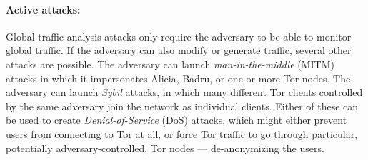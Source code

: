   \paragraph{Active attacks:}
  Global traffic analysis attacks only require the adversary to be able to
  monitor global traffic. If the adversary can also modify or generate
  traffic, several other attacks are possible. The adversary can launch
  \emph{man-in-the-middle} (MITM) attacks in which it impersonates Alicia,
  Badru, or one or more Tor nodes. The adversary can launch \emph{Sybil}
  attacks, in which many different Tor clients controlled by the same
  adversary join the network as individual clients. Either of these can be
  used to create \emph{Denial-of-Service} (DoS) attacks, which might either
  prevent users from connecting to Tor at all, or force Tor traffic to go
  through particular, potentially adversary-controlled, Tor nodes ---
  de-anonymizing the users.
